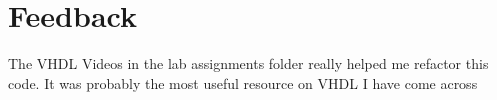 \documentclass{article}
\begin{document}

\section{Feedback}
The VHDL Videos in the lab assignments folder really helped me refactor this code. It was probably the most useful resource on VHDL I have come across






\end{document}
